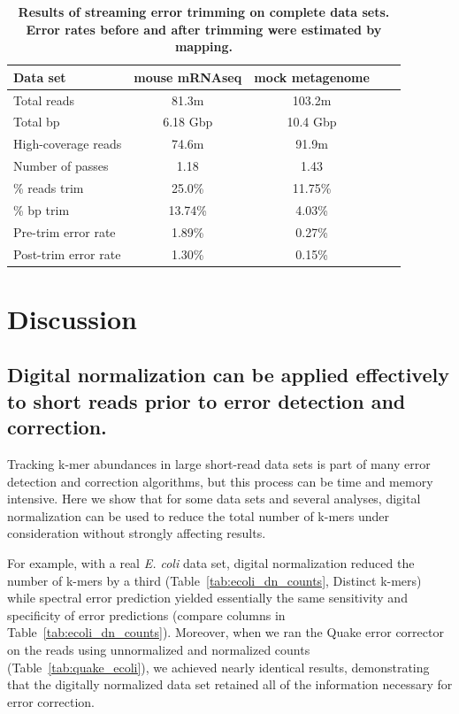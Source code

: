 \documentclass{article}
\begin{document}
\begin{table}
\centering
\begin{tabular}{|l|c|c|c|c|}
\hline

Data set             & mouse mRNAseq      & mock metagenome \\
\hline
Total reads          & 81.3m         & 103.2m \\
Total bp             & 6.18 Gbp      & 10.4 Gbp \\
High-coverage reads  & 74.6m         & 91.9m \\
Number of passes     & 1.18          & 1.43 \\
\% reads trim        & 25.0\%        & 11.75\% \\
\% bp trim           & 13.74\%       & 4.03\% \\
Pre-trim error rate  & 1.89\%        & 0.27\% \\
Post-trim error rate & 1.30\%        & 0.15\% \\
\hline
\end{tabular}

\caption{{\bf Results of streaming error trimming on complete data sets.
Error rates before and after trimming were estimated by mapping.}}
\label{tab:full_trimming}
\end{table}

\section{Discussion}

\subsection{Digital normalization can be applied effectively to short reads prior to error detection and correction.}

Tracking k-mer abundances in large short-read data sets is part of
many error detection and correction algorithms, but this process can
be time and memory intensive.  Here we show that for some data sets
and several analyses, digital normalization can be used to reduce the
total number of k-mers under consideration without strongly affecting
results.

For example, with a real {\em E. coli} data set, digital normalization
reduced the number of k-mers by a third
(Table~\ref{tab:ecoli_dn_counts}, Distinct k-mers) while spectral
error prediction yielded essentially the same sensitivity and
specificity of error predictions (compare columns in
Table~\ref{tab:ecoli_dn_counts}).  Moreover, when we ran the Quake
error corrector on the reads using unnormalized and normalized counts
(Table~\ref{tab:quake_ecoli}), we achieved nearly identical results,
demonstrating that the digitally normalized data set retained all of the
information necessary for error correction.
\end{document}
